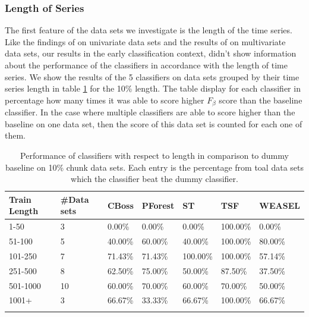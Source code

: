 \subsubsection{Length of Series}
The first feature of the data sets we investigate is the length of the time series.
Like the findings of \cite{bagnall2017great} on univariate data sets and the results of \cite{fawaz2019deepreview} on multivariate data sets,
our results in the early classification context, didn't show information about the performance of the classifiers in accordance with the length of time series.
We show the results of the 5 classifiers on data sets grouped by their time series length in table \ref{TableLength10} for the 10\% length.
The table display for each classifier in percentage how many times it was able to score higher $F_{\beta}$ score than the baseline classifier.
In the case where multiple classifiers are able to score higher than the baseline on one data set, then the score of this data set is counted for each one of them.

\begin{table}[hp!]
	\setlength\extrarowheight{2pt} %
	\begin{tabularx}{\textwidth}{|X|X|X|X|X|X|X|}
	\hline
	\textbf{Train Length} & \textbf{\#Data sets} & \textbf{CBoss} & \textbf{PForest} & \textbf{ST} & \textbf{TSF} & \textbf{WEASEL} \\ \hline
		1-50 & 3 & 0.00\% & 0.00\% & 0.00\% & 100.00\% & 0.00\% \\ \hline
		51-100 & 5 & 40.00\% & 60.00\% & 40.00\% & 100.00\% & 80.00\% \\ \hline
		101-250 & 7 & 71.43\% & 71.43\% & 100.00\% & 100.00\% & 57.14\% \\ \hline
		251-500 & 8 & 62.50\% & 75.00\% & 50.00\% & 87.50\% & 37.50\% \\ \hline
		501-1000 & 10 & 60.00\% & 70.00\% & 60.00\% & 70.00\% & 50.00\% \\ \hline
		1001+ & 3 & 66.67\% & 33.33\% & 66.67\% & 100.00\% & 66.67\% \\ \hline
	\caption{Performance of classifiers with respect to length in comparison to dummy baseline on 10\% chunk data sets. Each entry is the percentage from toal data sets which the classifier beat the dummy classifier.}
	\label{TableLength10}
  \end{tabularx}
\end{table}

